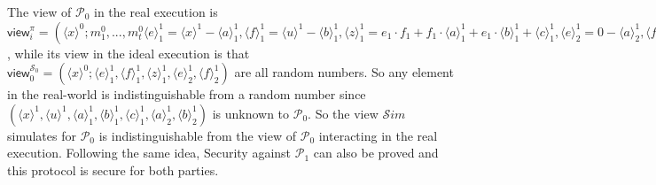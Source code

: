 \documentclass[letterpaper]{article} %
\begin{document}
    The view of $\mathcal{P}_{0}$ in the real execution is $\mathsf{view}_{i}^{\pi}=(\langle x\rangle ^{0};m^{0}_{1},...,m^{0}_{t}
    \langle e\rangle_{1}^{1}=\langle x\rangle^{1}-\langle a\rangle_{1}^{1},
    \langle f\rangle_{1}^{1}=\langle u\rangle^{1}-\langle b\rangle_{1}^{1},
    \langle z\rangle_{1}^{1} = e_{1} \cdot f_{1} + f_{1}\cdot \langle a\rangle_{1}^{1}
    +e_{1} \cdot \langle b\rangle^{1}_{1} + \langle c\rangle^{1}_{1},
    \langle e\rangle_{2}^{1}=0-\langle a\rangle_{2}^{1},
    \langle f\rangle_{2}^{1}=\llbracket s \rrbracket^{0}-\langle b\rangle_{2}^{1})$,
    while its view in the ideal execution is that
    $\mathsf{view}_{0}^{\mathcal{S}_{0}}=(\langle x\rangle ^{0};
    \langle e\rangle_{1}^{1},
    \langle f\rangle_{1}^{1},
    \langle z\rangle_{1}^{1},
    \langle e\rangle_{2}^{1},
    \langle f\rangle_{2}^{1})$ are all random numbers.
    So any element in the real-world
    is indistinguishable from a random number since $(\langle x\rangle^{1},\langle u\rangle^{1},\langle a\rangle_{1}^{1},\langle b\rangle_{1}^{1},\langle c\rangle^{1}_{1},
    \langle a\rangle_{2}^{1},\langle b\rangle_{2}^{1})$ is unknown to $\mathcal{P}_{0}$.
    So the view $\mathcal{S}im$ simulates for $\mathcal{P}_{0}$ is indistinguishable
    from the view of $\mathcal{P}_{0}$ interacting in the real execution.
    Following the same idea, Security against $\mathcal{P}_{1}$ can also be proved and
    this protocol is secure for both parties.
\end{document}

